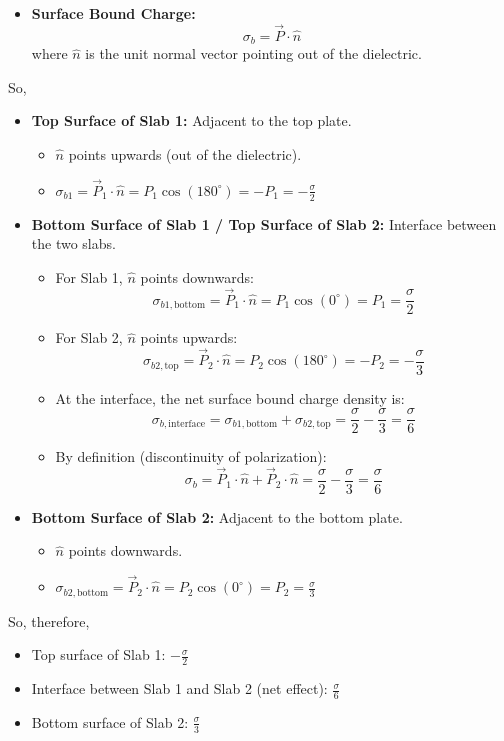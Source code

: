 \documentclass[a4paper]{article}
\begin{document}
\begin{tcolorbox}
\begin{tcolorbox}
\begin{itemize}
  \item \textbf{Surface Bound Charge:}
  \[
    \sigma_b = \vec{P} \cdot \hat{n}
  \]
  where $\hat{n}$ is the unit normal vector pointing out of the dielectric.
\end{itemize}
So,
\begin{itemize}
  \item \textbf{Top Surface of Slab 1:} Adjacent to the top plate.
  \begin{itemize}
    \item $\hat{n}$ points upwards (out of the dielectric).
    \item $\sigma_{b1} = \vec{P}_1 \cdot \hat{n} = P_1 \cos(180^\circ) = -P_1 = -\frac{\sigma}{2}$
  \end{itemize}
  
  \item \textbf{Bottom Surface of Slab 1 / Top Surface of Slab 2:} Interface between the two slabs.
  \begin{itemize}
    \item For Slab 1, $\hat{n}$ points downwards:
    \[
      \sigma_{b1,\text{bottom}} = \vec{P}_1 \cdot \hat{n} = P_1 \cos(0^\circ) = P_1 = \frac{\sigma}{2}
    \]
    
    \item For Slab 2, $\hat{n}$ points upwards:
    \[
      \sigma_{b2,\text{top}} = \vec{P}_2 \cdot \hat{n} = P_2 \cos(180^\circ) = -P_2 = -\frac{\sigma}{3}
    \]
    
    \item At the interface, the net surface bound charge density is:
    \[
      \sigma_{b,\text{interface}} = \sigma_{b1,\text{bottom}} + \sigma_{b2,\text{top}} = \frac{\sigma}{2} - \frac{\sigma}{3} = \frac{\sigma}{6}
    \]

    \item By definition (discontinuity of polarization):
    \[
      \sigma_b = \vec{P}_1 \cdot \hat{n} + \vec{P}_2 \cdot \hat{n} = \frac{\sigma}{2} - \frac{\sigma}{3} = \frac{\sigma}{6}
    \]
  \end{itemize}
  
  \item \textbf{Bottom Surface of Slab 2:} Adjacent to the bottom plate.
  \begin{itemize}
    \item $\hat{n}$ points downwards.
    \item $\sigma_{b2,\text{bottom}} = \vec{P}_2 \cdot \hat{n} = P_2 \cos(0^\circ) = P_2 = \frac{\sigma}{3}$
  \end{itemize}
\end{itemize}
So, therefore,
\begin{itemize}
  \item Top surface of Slab 1: $\boxed{-\frac{\sigma}{2}}$
  \item Interface between Slab 1 and Slab 2 (net effect): $\boxed{\frac{\sigma}{6}}$
  \item Bottom surface of Slab 2: $\boxed{\frac{\sigma}{3}}$
\end{itemize}
\end{tcolorbox}


\end{tcolorbox}
\end{document}
